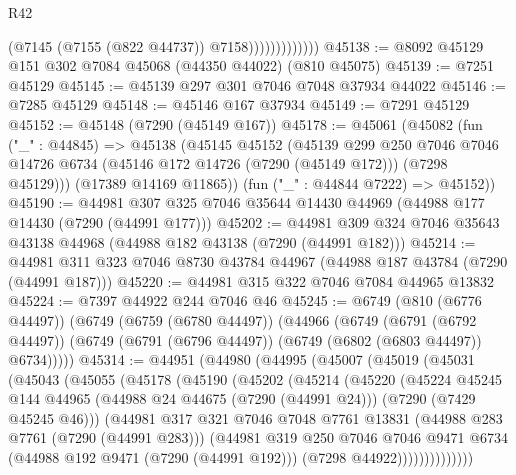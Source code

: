 \begin{lexlean}{R42}
\begin{coremodule}
{                            (@7145 (@7155 (@822 @44737)) @7158)))))))))))))
@45138 := @8092 @45129 @151 @302 @7084 @45068 (@44350 @44022) (@810 @45075)
@45139 := @7251 @45129
@45145 := @45139 @297 @301 @7046 @7048 @37934 @44022
@45146 := @7285 @45129
@45148 := @45146 @167 @37934
@45149 := @7291 @45129
@45152 := @45148 (@7290 (@45149 @167))
@45178 := @45061
    (@45082
      (fun ("_" : @44845) =>
      @45138
        (@45145
          @45152
          (@45139
            @299
            @250
            @7046
            @7046
            @14726
            @6734
            (@45146 @172 @14726 (@7290 (@45149 @172)))
            (@7298 @45129)))
        (@17389 @14169 @11865))
      (fun ("_" : @44844 @7222) => @45152))
@45190 := @44981 @307 @325 @7046 @35644 @14430 @44969 (@44988 @177 @14430 (@7290 (@44991 @177)))
@45202 := @44981 @309 @324 @7046 @35643 @43138 @44968 (@44988 @182 @43138 (@7290 (@44991 @182)))
@45214 := @44981 @311 @323 @7046 @8730 @43784 @44967 (@44988 @187 @43784 (@7290 (@44991 @187)))
@45220 := @44981 @315 @322 @7046 @7084 @44965 @13832
@45224 := @7397 @44922 @244 @7046 @46
@45245 := @6749
    (@810 (@6776 @44497))
    (@6749
      (@6759 (@6780 @44497))
      (@44966
        (@6749
          (@6791 (@6792 @44497))
          (@6749 (@6791 (@6796 @44497)) (@6749 (@6802 (@6803 @44497)) @6734)))))
@45314 := @44951
    (@44980
      (@44995
        (@45007
          (@45019
            (@45031
              (@45043
                (@45055
                  (@45178
                    (@45190
                      (@45202
                        (@45214
                          (@45220
                            (@45224
                              @45245
                              @144
                              @44965
                              (@44988 @24 @44675 (@7290 (@44991 @24)))
                              (@7290 (@7429 @45245 @46)))
                            (@44981
                              @317
                              @321
                              @7046
                              @7048
                              @7761
                              @13831
                              (@44988 @283 @7761 (@7290 (@44991 @283)))
                              (@44981
                                @319
                                @250
                                @7046
                                @7046
                                @9471
                                @6734
                                (@44988 @192 @9471 (@7290 (@44991 @192)))
                                (@7298 @44922))))))))))))))
}
\end{coremodule}
\end{lexlean}
